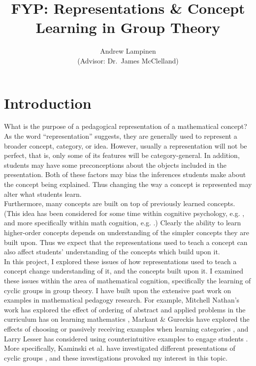 \documentclass[11pt]{article}
\begin{document}
\title{FYP: Representations \& Concept Learning in Group Theory}
\author{Andrew Lampinen \\ (Advisor: Dr.\ James McClelland)}
\date{}
\maketitle
\section{Introduction}
What is the purpose of a pedagogical representation of a mathematical concept? As the word ``representation'' suggests, they are generally used to represent a broader concept, category, or idea. However, usually a representation will not be perfect, that is, only some of its features will be category-general. In addition, students may have some preconceptions about the objects included in the presentation. Both of these factors may bias the inferences students make about the concept being explained. Thus changing the way a concept is represented may alter what students learn. \\[11pt]
Furthermore, many concepts are built on top of previously learned concepts. (This idea has been considered for some time within cognitive psychology, e.g. \cite{Fischer1980}, and more specifically within math cognition, e.g. \cite{Hazzan1999}.) Clearly the ability to learn higher-order concepts depends on understanding of the simpler concepts they are built upon. Thus we expect that the representations used to teach a concept can also affect students' understanding of the concepts which build upon it.\\[11pt]
In this project, I explored these issues of how representations used to teach a concept change understanding of it, and the concepts built upon it. I examined these issues within the area of mathematical cognition, specifically the learning of cyclic groups in group theory. I have built upon the extensive past work on examples in mathematical pedagogy research. For example, Mitchell Nathan's work has explored the effect of ordering of abstract and applied problems in the curriculum has on learning mathematics \cite{Nathan2012}, Markant \& Gureckis have explored the effects of choosing or passively receiving examples when learning categories \cite{Markant2014}, and Larry Lesser has considered using counterintuitive examples to engage students \cite{Lesser1998}. More specifically, Kaminski et al. have investigated different presentations of cyclic groups \cite{Kaminski2008}, and these investigations provoked my interest in this topic. 
\end{document}
